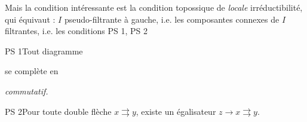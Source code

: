\documentclass[11pt]{article}
\begin{document}
Mais la condition intéressante est la condition topossique de \textit{locale} irréductibilité, qui équivaut : $I$ pseudo-filtrante à gauche, i.e. les composantes connexes de $I$ filtrantes, i.e. les conditions PS 1, PS 2

PS 1\enspace Tout diagramme  se complète en  \textit{commutatif.}

PS 2\enspace Pour toute double flèche $x \rightrightarrows y$, existe un égalisateur $z \longrightarrow x \rightrightarrows y$.
\end{document}
